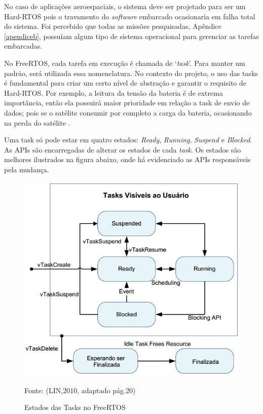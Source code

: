No caso de aplicações aeroespaciais, o sistema deve ser projetado para ser um Hard-RTOS pois o travamento do \textit{software} embarcado ocasionaria em falha total do sistema. Foi percebido que todas as missões pesquisadas, Apêndice \ref{apendiceb}, possuíam algum tipo de sistema operacional para gerenciar as tarefas embarcadas.

No FreeRTOS, cada tarefa em execução é chamada de ‘\textit{task}’. Para manter um padrão, será utilizada essa nomenclatura. No contexto do projeto, o uso das tasks é fundamental para criar um certo nível de abstração e garantir o requisito de Hard-RTOS. Por exemplo, a leitura da tensão da bateria é de extrema importância, então ela possuirá maior prioridade em relação a task de envio de dados; pois se o satélite consumir por completo a carga da bateria, ocasionando na perda do satélite .

Uma task só pode estar em quatro estados: \textit{Ready}, \textit{Running}, \textit{Suspend} e \textit{Blocked}. As APIs são encarregadas de alterar os estados de cada \textit{task}. Os estados são melhores ilustrados na figura abaixo, onde há evidenciado as APIs responsáveis pela mudança.

\begin{figure}[h]
	\centering
	\caption{Estados das Tasks no FreeRTOS}
	 \includegraphics[keepaspectratio=true,scale=0.8]{figuras/freertosTasks.PNG}
	 
	 Fonte: (LIN,2010, adaptado pág.20)
	
	\label{fig23}
\end{figure}

